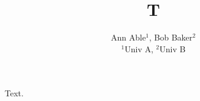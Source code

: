 \documentclass{article}
\begin{document}
\title{T}
\author{Ann Able$^1$, Bob Baker$^2$ \\
{\small $^1$Univ A, $^2$Univ B}}
\maketitle
Text.
\end{document}

